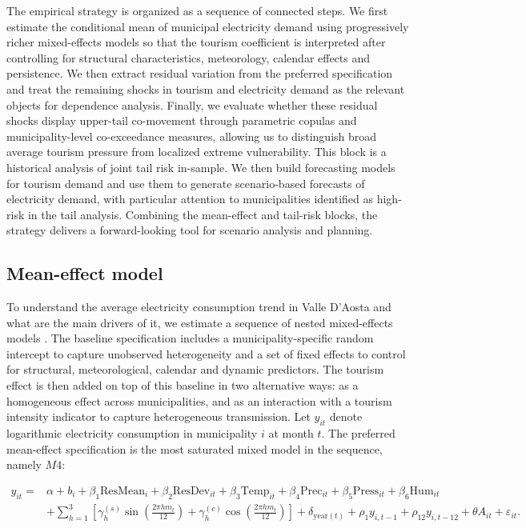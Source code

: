\documentclass[11pt,a4paper]{article}
\begin{document}
The empirical strategy is organized as a sequence of connected steps. We first estimate the conditional mean of municipal electricity demand using progressively richer mixed-effects models 
so that the tourism coefficient is interpreted after controlling for structural characteristics, 
meteorology, calendar effects and persistence. 
We then extract residual variation from the preferred specification 
and treat the remaining shocks in tourism and electricity demand 
as the relevant objects for dependence analysis. Finally, we evaluate whether 
these residual shocks display upper-tail co-movement through parametric copulas 
and municipality-level co-exceedance measures, allowing us to distinguish 
broad average tourism pressure from localized extreme vulnerability. This block is a historical analysis of joint tail risk in-sample. We then build forecasting models for tourism demand and use them to generate scenario-based forecasts of electricity demand, with particular attention to municipalities identified as high-risk in the tail analysis. Combining the mean-effect and tail-risk blocks, the strategy delivers a forward-looking tool for scenario analysis and planning.

\subsection{Mean-effect model}\label{sec:mean-effect-model}
To understand the  average electricity consumption trend in Valle D'Aosta
and what are the main drivers of it, we estimate a sequence of nested mixed-effects
 models \citep{gelman2007data}. The baseline specification includes a municipality-specific random 
intercept to capture unobserved heterogeneity and a set of fixed effects to 
control for structural, meteorological, calendar and dynamic predictors. 
The tourism effect is then added on top of this baseline in two alternative ways: 
as a homogeneous effect across municipalities, and as an interaction with a tourism
 intensity indicator to capture heterogeneous transmission. 
Let $y_{it}$ denote logarithmic electricity consumption in municipality $i$ 
at month $t$. The preferred mean-effect specification is the most saturated mixed model
 in the sequence, namely $M4$:

\begin{equation}
\label{eq:m4}
\begin{aligned}
y_{it} = {} & \alpha + b_i + \beta_1 \text{ResMean}_{i} + \beta_2 \text{ResDev}_{it} + \beta_3 \text{Temp}_{it} + \beta_4 \text{Prec}_{it} + \beta_5 \text{Press}_{it} + \beta_6 \text{Hum}_{it} \\
& + \sum_{h=1}^{3} \left[\gamma_h^{(s)} \sin\left(\frac{2\pi h m_t}{12}\right) + \gamma_h^{(c)} \cos\left(\frac{2\pi h m_t}{12}\right)\right] + \delta_{\text{year}(t)} + \rho_1 y_{i,t-1} + \rho_{12} y_{i,t-12} + \theta A_{it} + \varepsilon_{it}.
\end{aligned}
\end{equation}
\end{document}
